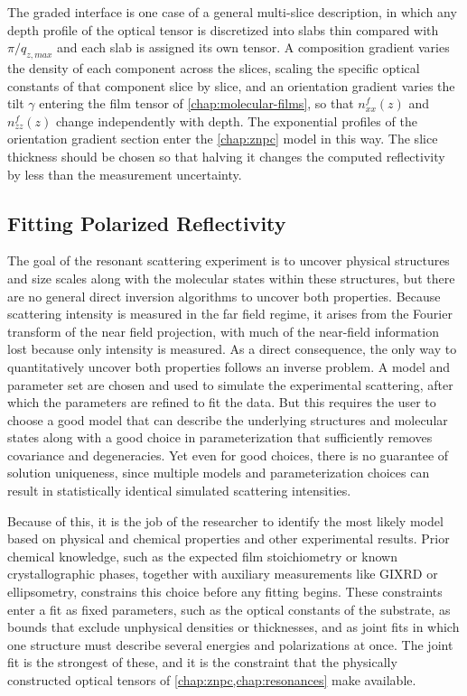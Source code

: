 The graded interface is one case of a general multi-slice description, in which any depth profile of the optical tensor is discretized into slabs thin compared with \(\pi/q_{z,max}\) and each slab is assigned its own tensor. A composition gradient varies the density of each component across the slices, scaling the specific optical constants of that component slice by slice, and an orientation gradient varies the tilt \(\gamma\) entering the film tensor of \cref{chap:molecular-films}, so that \(n_{xx}^{f}(z)\) and \(n_{zz}^{f}(z)\) change independently with depth. The exponential profiles of the orientation gradient section enter the \cref{chap:znpc} model in this way. The slice thickness should be chosen so that halving it changes the computed reflectivity by less than the measurement uncertainty.

\subsection{Fitting Polarized Reflectivity}\label{sec:fitting-polarized-reflectivity}

The goal of the resonant scattering experiment is to uncover physical structures and size scales along with the molecular states within these structures, but there are no general direct inversion algorithms to uncover both properties. Because scattering intensity is measured in the far field regime, it arises from the Fourier transform of the near field projection, with much of the near-field information lost because only intensity is measured. As a direct consequence, the only way to quantitatively uncover both properties follows an inverse problem. A model and parameter set are chosen and used to simulate the experimental scattering, after which the parameters are refined to fit the data. But this requires the user to choose a good model that can describe the underlying structures and molecular states along with a good choice in parameterization that sufficiently removes covariance and degeneracies. Yet even for good choices, there is no guarantee of solution uniqueness, since multiple models and parameterization choices can result in statistically identical simulated scattering intensities.

Because of this, it is the job of the researcher to identify the most likely model based on physical and chemical properties and other experimental results. Prior chemical knowledge, such as the expected film stoichiometry or known crystallographic phases, together with auxiliary measurements like GIXRD or ellipsometry, constrains this choice before any fitting begins. These constraints enter a fit as fixed parameters, such as the optical constants of the substrate, as bounds that exclude unphysical densities or thicknesses, and as joint fits in which one structure must describe several energies and polarizations at once. The joint fit is the strongest of these, and it is the constraint that the physically constructed optical tensors of \cref{chap:znpc,chap:resonances} make available.

